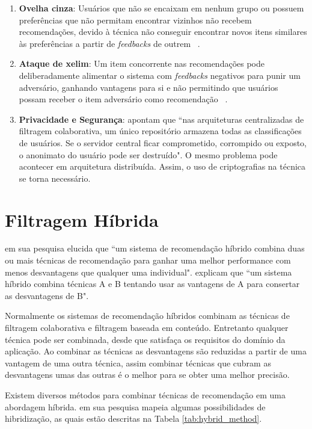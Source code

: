 \begin{enumerate}
    \item \textbf{Ovelha cinza}: Usuários que não se encaixam em nenhum grupo ou possuem preferências que não permitam encontrar vizinhos não recebem recomendações, devido à técnica não conseguir encontrar novos itens similares às preferências a partir de \textit{feedbacks} de outrem~ \cite{qin:2013, Su:2009}.
    
    \item \textbf{Ataque de xelim}: Um item concorrente nas recomendações pode deliberadamente alimentar o sistema com \textit{feedbacks} negativos para punir um adversário, ganhando vantagens para si e não permitindo que usuários possam receber o item adversário como recomendação~ \cite{qin:2013, Su:2009}.
    
    \item \textbf{Privacidade e Segurança}:  apontam que ``nas arquiteturas centralizadas de filtragem colaborativa, um único repositório armazena todas as classificações de usuários. Se o servidor central ficar comprometido, corrompido ou exposto, o anonimato do usuário pode ser destruído". O mesmo problema pode acontecer em arquitetura distribuída. Assim, o uso de criptografias na técnica se torna necessário.
\end{enumerate}

\section{Filtragem Híbrida}
 em sua pesquisa elucida que ``um sistema de recomendação híbrido combina duas ou mais técnicas de recomendação para ganhar uma melhor performance com menos desvantagens que qualquer uma individual".  explicam que ``um sistema híbrido combina técnicas A e B tentando usar as vantagens de A para consertar as desvantagens de B".

Normalmente os sistemas de recomendação híbridos combinam as técnicas de filtragem colaborativa e filtragem baseada em conteúdo. Entretanto qualquer técnica pode ser combinada, desde que satisfaça os requisitos do domínio da aplicação. Ao combinar as técnicas as desvantagens são reduzidas a partir de uma vantagem de uma outra técnica, assim combinar técnicas que cubram as desvantagens umas das outras é o melhor para se obter uma melhor precisão.

Existem diversos métodos para combinar técnicas de recomendação em uma abordagem híbrida.  em sua pesquisa mapeia algumas possibilidades de hibridização, as quais estão descritas na Tabela \ref{tab:hybrid_method}.

